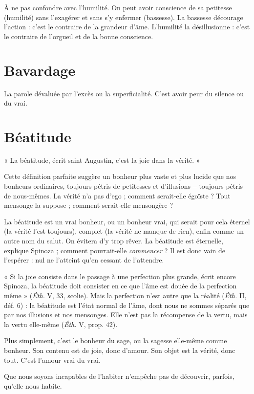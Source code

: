 À ne pas confondre avec l'humilité. On peut avoir conscience de sa petitesse
(humilité) sans l’exagérer et sans s’y enfermer (bassesse). La bassesse
décourage l’action : c’est le contraire de la grandeur d’âme. L’humilité la
désillusionne : c’est le contraire de l’orgueil et de la bonne conscience.

\section{Bavardage}
La parole dévaluée par l’excès ou la superficialité. C’est avoir
peur du silence ou du vrai.

\section{Béatitude}
« La béatitude, écrit saint Augustin, c’est la joie dans la vérité. »

Cette définition parfaite suggère un bonheur plus vaste et
plus lucide que nos bonheurs ordinaires, toujours pétris de petitesses et d’illusions {\bf --}
toujours pétris de nous-mêmes. La vérité n’a pas d’ego ; comment
serait-elle égoïste ? Tout mensonge la suppose ; comment serait-elle mensongère ?

La béatitude est un vrai bonheur, ou un bonheur vrai, qui serait pour cela
éternel (la vérité l’est toujours), complet (la vérité ne manque de rien), enfin
comme un autre nom du salut. On évitera d’y trop rêver. La béatitude est éternelle,
explique Spinoza ; comment pourrait-elle {\it commencer} ? Il est donc vain de
l’espérer : nul ne l’atteint qu’en cessant de l’attendre.

« Si la joie consiste dans le passage à une perfection plus grande, écrit
encore Spinoza, la béatitude doit consister en ce que l’âme est douée de la perfection
même » ({\it Éth.} V, 33, scolie). Mais la perfection n’est autre que la réalité
({\it Éth.} II, déf. 6) : la béatitude est l’état normal de l’âme, dont nous ne sommes
séparés que par nos illusions et nos mensonges. Elle n’est pas la récompense de
la vertu, mais la vertu elle-même ({\it Éth.} V, prop. 42).

Plus simplement, c’est le bonheur du sage, ou la sagesse elle-même comme
bonheur. Son contenu est de joie, donc d’amour. Son objet est la vérité, donc
tout. C’est l’amour vrai du vrai.

Que nous soyons incapables de l’habiter n'empêche pas de découvrir, parfois,
qu’elle nous habite.

